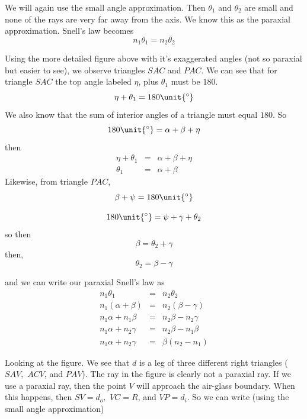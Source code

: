 \documentclass{article}
\begin{document}
We will again use the small angle approximation. Then $\theta _{1}$ and $%
\theta _{2}$ are small and none of the rays are very far away from the axis.
We know this as the paraxial approximation. Snell's law becomes 
\[
n_{1}\theta _{1}=n_{2}\theta _{2}
\]

Using the more detailed figure
above with it's exaggerated angles (not so paraxial but easier to see), we
observe triangles $SAC$ and $PAC.$ We can see that for triangle $SAC$ the
top angle labeled $\eta $, plus $\theta _{1}$ must be $180.$ 
\[
\eta +\theta _{1}=180\unit{%
{{}^\circ}%
}
\]%
We also know that the sum of interior angles of a triangle must equal $180.$
So%
\[
180\unit{%
{{}^\circ}%
}=\alpha +\beta +\eta
\]%
then 
\begin{eqnarray*}
\eta +\theta _{1} &=&\alpha +\beta +\eta \\
\theta _{1} &=&\alpha +\beta
\end{eqnarray*}%
Likewise, from triangle $PAC$,%
\[
\beta +\psi =180\unit{%
{{}^\circ}%
}
\]

\[
180\unit{%
{{}^\circ}%
}=\psi +\gamma +\theta _{2}
\]%
so then 
\[
\beta =\theta _{2}+\gamma
\]%
then, 
\[
\theta _{2}=\beta -\gamma
\]

and we can write our paraxial Snell's law as%
\begin{eqnarray*}
n_{1}\theta _{1} &=&n_{2}\theta _{2} \\
n_{1}\left( \alpha +\beta \right) &=&n_{2}\left( \beta -\gamma \right) \\
n_{1}\alpha +n_{1}\beta &=&n_{2}\beta -n_{2}\gamma \\
n_{1}\alpha +n_{2}\gamma &=&n_{2}\beta -n_{1}\beta \\
n_{1}\alpha +n_{2}\gamma &=&\beta \left( n_{2}-n_{1}\right)
\end{eqnarray*}

Looking at the figure. We see that $d$ is a leg of three different right
triangles ($SAV,$ $ACV$, and $PAV$). The ray in the figure is clearly not a
paraxial ray. If we use a paraxial ray, then the point $V$ will approach the
air-glass boundary. When this happens, then $SV=d_{o},$ $VC=R$, and $%
VP=d_{i}.$ So we can write (using the small angle approximation)
\end{document}
